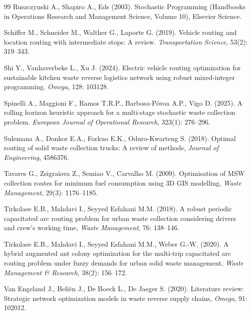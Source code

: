 \documentclass[authoryear,preprint,12pt]{elsarticle}
\begin{document}
\begin{thebibliography}{99}
Ruszczynski A., Shapiro A., Eds (2003). Stochastic Programming (Handbooks in Operations Research and Management Science, Volume 10), Elsevier Science.

Schiffer M., Schneider M., Walther G., Laporte G. (2019). Vehicle routing and location routing with intermediate stops: A review. \textit{Transportation Science}, 53(2): 319--343.

 Shi Y., Vanhaverbeke L., Xu J. (2024). Electric vehicle routing optimization for sustainable kitchen waste reverse logistics network using robust mixed-integer programming. \textit{Omega},  128: 103128.

Spinelli A., Maggioni F., Ramos T.R.P., Barbosa-Póvoa A.P., Vigo D. (2025). A rolling horizon heuristic approach for a multi-stage stochastic waste collection problem. \textit{European Journal of Operational Research}, 323(1): 276--296.

Sulemana A., Donkor E.A., Forkuo E.K., Oduro-Kwarteng S. (2018). Optimal routing of solid waste collection trucks: A review of methods, \textit{Journal of Engineering}, 4586376.

Tavares G., Zsigraiova Z., Semiao V., Carvalho M. (2009). Optimisation of MSW collection routes for minimum fuel consumption using 3D GIS modelling, \textit{Waste Management}, 29(3): 1176--1185.

Tirkolaee E.B., Mahdavi I., Seyyed Esfahani M.M. (2018). A robust periodic capacitated arc routing problem for urban waste collection considering drivers and crew’s working time, \textit{Waste Management}, 76: 138--146.

Tirkolaee E.B., Mahdavi I., Seyyed Esfahani M.M., Weber G.-W. (2020). A hybrid augmented ant colony optimization for the multi-trip capacitated arc routing problem under fuzzy demands for urban solid waste management, \textit{Waste Management \& Research}, 38(2): 156--172.

Van Engeland J., Beliën J., De Boeck L., De Jaeger S. (2020). Literature review: Strategic network optimization models in waste reverse supply chains, \textit{Omega}, 91: 102012.  


\end{thebibliography}
\end{document}
